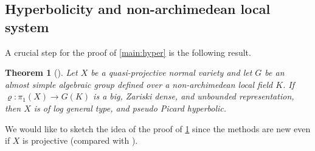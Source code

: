 \documentclass[english]{amsproc}
\theoremstyle{plain}
\newtheorem{thm}{Theorem}[section]
\theoremstyle{definition}
\theoremstyle{remark}
\theoremstyle{plain}
\numberwithin{equation}{thm} %
\begin{document}
	
	
	\subsection{Hyperbolicity and non-archimedean local system}
	A crucial step for the proof of  \cref{main:hyper} is the following result.
	
	\begin{thm}[{\cite[Theorem F]{CDY22}}]\label{main:unbounded hyperbolic}
		Let $X$ be a quasi-projective normal variety and let $G$ be an   almost simple algebraic group defined over a non-archimedean local field $K$. If $\varrho:\pi_1(X)\to G(K)$ is a big, Zariski dense, and unbounded representation, then $X$ is   of log general type, and  pseudo Picard hyperbolic.  
	\end{thm}  
	We would like to sketch the idea of the proof of \cref{main:unbounded hyperbolic} since the methods are new even if $X$ is projective (compared with \cite{CCE15}).
\end{document}

